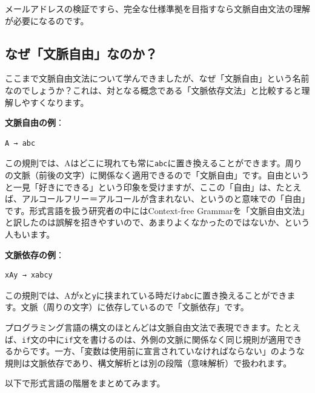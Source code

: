 メールアドレスの検証ですら、完全な仕様準拠を目指すなら文脈自由文法の理解が必要になるのです。

\hypertarget{chapter4-ux306aux305cux6587ux8108ux81eaux7531ux306aux306eux304b}{%
\subsection{なぜ「文脈自由」なのか？}\label{chapter4-ux306aux305cux6587ux8108ux81eaux7531ux306aux306eux304b}}

ここまで文脈自由文法について学んできましたが、なぜ「文脈自由」という名前なのでしょうか？これは、対となる概念である「文脈依存文法」と比較すると理解しやすくなります。

\textbf{文脈自由の例}：

\begin{verbatim}
A → abc
\end{verbatim}

この規則では、Aはどこに現れても常に\texttt{abc}に置き換えることができます。周りの文脈（前後の文字）に関係なく適用できるので「文脈自由」です。自由というと一見「好きにできる」という印象を受けますが、ここの「自由」は、たとえば、アルコールフリー＝アルコールが含まれない、というのと意味での「自由」です。形式言語を扱う研究者の中にはContext-free Grammarを「文脈自由文法」と訳したのは誤解を招きやすいので、あまりよくなかったのではないか、という人もいます。

\textbf{文脈依存の例}：

\begin{verbatim}
xAy → xabcy
\end{verbatim}

この規則では、Aが\texttt{x}と\texttt{y}に挟まれている時だけ\texttt{abc}に置き換えることができます。文脈（周りの文字）に依存しているので「文脈依存」です。

プログラミング言語の構文のほとんどは文脈自由文法で表現できます。たとえば、\texttt{if}文の中に\texttt{if}文を書けるのは、外側の文脈に関係なく同じ規則が適用できるからです。一方、「変数は使用前に宣言されていなければならない」のような規則は文脈依存であり、構文解析とは別の段階（意味解析）で扱われます。

以下で形式言語の階層をまとめてみます。

